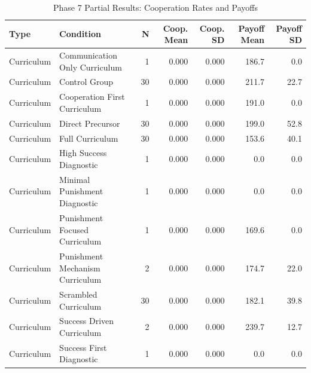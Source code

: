 \begin{table}[ht]
\centering
\caption{Phase 7 Partial Results: Cooperation Rates and Payoffs}
\label{tab:phase7_partial}
\begin{tabular}{llrrrrr}
\toprule
\textbf{Type} & \textbf{Condition} & \textbf{N} & \textbf{Coop. Mean} & \textbf{Coop. SD} & \textbf{Payoff Mean} & \textbf{Payoff SD} \\
\midrule
Curriculum & Communication Only Curriculum & 1 & 0.000 & 0.000 & 186.7 & 0.0 \\
Curriculum & Control Group & 30 & 0.000 & 0.000 & 211.7 & 22.7 \\
Curriculum & Cooperation First Curriculum & 1 & 0.000 & 0.000 & 191.0 & 0.0 \\
Curriculum & Direct Precursor & 30 & 0.000 & 0.000 & 199.0 & 52.8 \\
Curriculum & Full Curriculum & 30 & 0.000 & 0.000 & 153.6 & 40.1 \\
Curriculum & High Success Diagnostic & 1 & 0.000 & 0.000 & 0.0 & 0.0 \\
Curriculum & Minimal Punishment Diagnostic & 1 & 0.000 & 0.000 & 0.0 & 0.0 \\
Curriculum & Punishment Focused Curriculum & 1 & 0.000 & 0.000 & 169.6 & 0.0 \\
Curriculum & Punishment Mechanism Curriculum & 2 & 0.000 & 0.000 & 174.7 & 22.0 \\
Curriculum & Scrambled Curriculum & 30 & 0.000 & 0.000 & 182.1 & 39.8 \\
Curriculum & Success Driven Curriculum & 2 & 0.000 & 0.000 & 239.7 & 12.7 \\
Curriculum & Success First Diagnostic & 1 & 0.000 & 0.000 & 0.0 & 0.0 \\
\bottomrule
\end{tabular}
\end{table}
